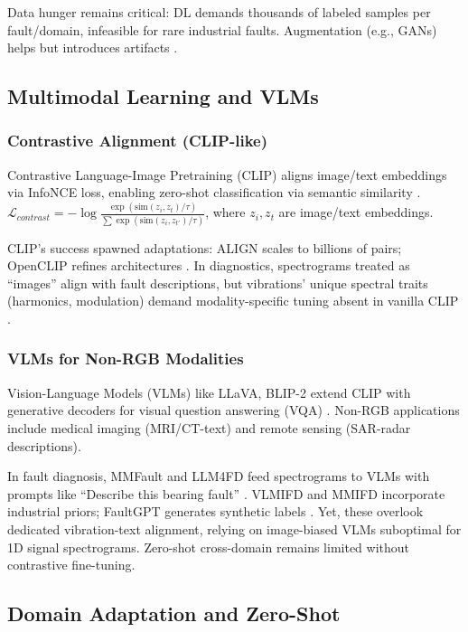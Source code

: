 Data hunger remains critical: DL demands thousands of labeled samples per fault/domain, infeasible for rare industrial faults. Augmentation (e.g., GANs) helps but introduces artifacts \cite{hoang2023vit}.

\subsection{Multimodal Learning and VLMs}
\subsubsection{Contrastive Alignment (CLIP-like)}
Contrastive Language-Image Pretraining (CLIP) aligns image/text embeddings via InfoNCE loss, enabling zero-shot classification via semantic similarity \cite{radford2021clip}. $\mathcal{L}_{contrast} = -\log \frac{\exp(\mathrm{sim}(z_i, z_t)/\tau)}{\sum \exp(\mathrm{sim}(z_i, z_{t'})/\tau)}$, where $z_i, z_t$ are image/text embeddings.

CLIP's success spawned adaptations: ALIGN scales to billions of pairs; OpenCLIP refines architectures \cite{li2023align,jia2021scaling}. In diagnostics, spectrograms treated as ``images'' align with fault descriptions, but vibrations' unique spectral traits (harmonics, modulation) demand modality-specific tuning absent in vanilla CLIP \cite{kim2025llmzs}.

\subsubsection{VLMs for Non-RGB Modalities}
Vision-Language Models (VLMs) like LLaVA, BLIP-2 extend CLIP with generative decoders for visual question answering (VQA) \cite{liu2023llava}. Non-RGB applications include medical imaging (MRI/CT-text) and remote sensing (SAR-radar descriptions).

In fault diagnosis, MMFault and LLM4FD feed spectrograms to VLMs with prompts like ``Describe this bearing fault'' \cite{zhang2024mmfault,li2024llm4fd}. VLMIFD and MMIFD incorporate industrial priors; FaultGPT generates synthetic labels \cite{zhao2025vlmifd,xu2025mmifd,liu2024faultgpt}. Yet, these overlook dedicated vibration-text alignment, relying on image-biased VLMs suboptimal for 1D signal spectrograms. Zero-shot cross-domain remains limited without contrastive fine-tuning.

\subsection{Domain Adaptation and Zero-Shot}
